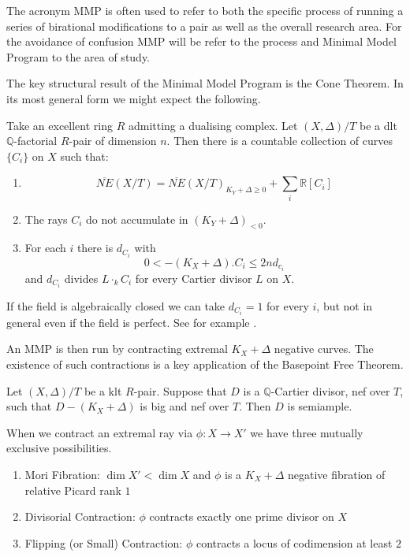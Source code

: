 The acronym MMP is often used to refer to both the specific process of running a series of birational modifications to a pair as well as the overall research area. For the avoidance of confusion MMP will be refer to the process and Minimal Model Program to the area of study.

The key structural result of the Minimal Model Program is the Cone Theorem. In its most general form we might expect the following.

\begin{conjecture}\label{cone-conj}
	Take an excellent ring $R$ admitting a dualising complex.
	Let $(X,\Delta)/T$ be a dlt $\mathbb{Q}$-factorial $R$-pair of dimension $n$. Then there is a countable collection of curves $\{C_{i}\}$ on $X$ such that:
	\begin{enumerate}
		\item $$\overline{NE}(X/T)=\overline{NE}(X/T)_{K_{Y}+\Delta \geq 0} + \sum_{i} \mathbb{R}[C_{i}]$$
		\item The rays $C_{i}$ do not accumulate in $(K_{Y}+\Delta)_{<0}$.
		\item For each $i$ there is $d_{C_{i}}$ with 
		\[0 < -(K_{X}+\Delta).C_{i} \leq 2nd_{c_{i}}\]
		and $d_{C_{i}}$ divides $L\cdot_{k}C_{i}$ for every Cartier divisor $L$ on $X$.
	\end{enumerate}
\end{conjecture}

If the field is algebraically closed we can take $d_{C_{i}}=1$ for every $i$, but not in general even if the field is perfect. See for example \cite[Example 7.3]{tanaka2018behavior}.

An MMP is then run by contracting extremal $K_{X}+\Delta$ negative curves. The existence of such contractions is a key application of the Basepoint Free Theorem.

\begin{conjecture}\label{bpt-conj}
	Let $(X,\Delta)/T$ be a klt $R$-pair. Suppose that $D$ is a $\mathbb{Q}$-Cartier divisor, nef over $T$, such that $D-(K_{X}+\Delta)$ is big and nef over $T$. Then $D$ is semiample.
\end{conjecture}

When we contract an extremal ray via $\phi\colon X \to X'$ we have three mutually exclusive possibilities.

\begin{enumerate}
	\item Mori Fibration: $\dim X' < \dim X$ and $\phi$ is a $K_{X}+\Delta$ negative fibration of relative Picard rank $1$
	\item Divisorial Contraction: $\phi$ contracts exactly one prime divisor on $X$
	\item Flipping (or Small) Contraction: $\phi$ contracts a locus of codimension at least $2$
\end{enumerate}

